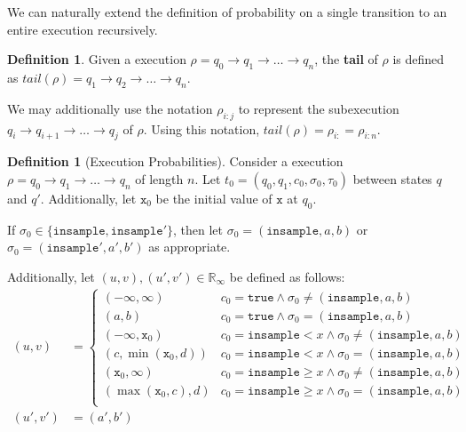 \documentclass[12pt]{article}
\newcommand{\RR}{\mathbb{R}}
\newcommand{\gguard}[1][x]{\texttt{insample}\geq #1}
\newcommand{\lguard}[1][x]{\texttt{insample} < #1}
\theoremstyle{definition}
\newtheorem{defn}[thm]{Definition}
\begin{document}
We can naturally  extend the definition of probability on a single transition to an entire execution recursively.

\begin{defn}
    Given a execution $\rho = q_0\to q_1\to \ldots \to q_n$, the \textbf{tail} of $\rho$ is defined as $tail(\rho) = q_1\to q_2 \to \ldots\to q_n$. 

    We may additionally use the notation $\rho_{i:j}$ to represent the subexecution $q_i\to q_{i+1}\to \ldots \to q_j$ of $\rho$. Using this notation, $tail(\rho) = \rho_{i:} = \rho_{i:n}$.
\end{defn}

\begin{defn}[Execution Probabilities]
    Consider a execution $\rho = q_0\to q_1\to \ldots \to q_n$ of length $n$. Let $t_0=(q_0, q_1, c_0, \sigma_0, \tau_0)$ between states $q$ and $q'$. Additionally, let $\texttt{x}_0$ be the initial value of $\texttt{x}$ at $q_0$. 
    
    If $\sigma_0 \in \{\texttt{insample}, \texttt{insample}'\}$, then let $\sigma_0 = (\texttt{insample}, a, b)$ or $\sigma_0 = (\texttt{insample}', a', b')$ as appropriate. 

    Additionally, let $(u, v), (u', v')\in \RR_{\infty}$ be defined as follows:
    \begin{align*}
        (u, v) &= \begin{cases}
        (-\infty, \infty) & c_0=\texttt{true}\land \sigma_0 \neq (\texttt{insample}, a, b)\\
        (a, b) &c_0=\texttt{true}\land \sigma_0 = (\texttt{insample}, a, b)\\
        (-\infty, \texttt{x}_0) & c_0=\lguard\land \sigma_0 \neq (\texttt{insample}, a, b)\\
        (c, \min(\texttt{x}_0, d)) &c_0=\lguard\land \sigma_0 = (\texttt{insample}, a, b)\\
        (\texttt{x}_0, \infty) & c_0=\gguard\land \sigma_0 \neq (\texttt{insample}, a, b)\\
        (\max(\texttt{x}_0, c), d) &c_0=\gguard\land \sigma_0 = (\texttt{insample}, a, b)\\
    \end{cases}\\
    (u', v')& = (a', b')\end{align*}


\end{defn}
\end{document}
